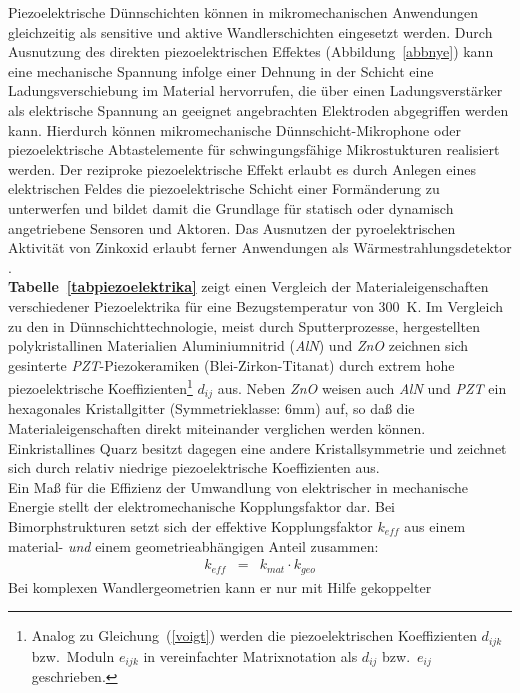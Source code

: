 Piezoelektrische Dünnschichten können in mikromechanischen Anwendungen
gleichzeitig als sensitive und aktive Wandlerschichten eingesetzt
werden. Durch Ausnutzung des direkten piezoelektrischen Effektes
(Abbildung~\ref{abbnye}) kann eine mechanische Spannung infolge einer
Dehnung in der Schicht
eine Ladungsverschiebung im Material hervorrufen, die über einen
Ladungsverstärker als elektrische Spannung an geeignet angebrachten
Elektroden abgegriffen werden kann.  Hierdurch können mikromechanische
Dünnschicht-Mikrophone \cite{Fra88, Kim87} oder piezoelektrische
Abtastelemente für schwingungsfähige Mikrostukturen \cite{Blo90}
realisiert werden.  Der reziproke piezoelektrische Effekt erlaubt es
durch Anlegen eines elektrischen Feldes die piezoelektrische Schicht
einer Formänderung zu unterwerfen und bildet damit die Grundlage für
statisch oder dynamisch angetriebene Sensoren und Aktoren. Das Ausnutzen
der pyroelektrischen Aktivität von Zinkoxid erlaubt ferner Anwendungen
als Wärmestrahlungsdetektor \cite{Pol84}. \\
{\bf Tabelle~\ref{tabpiezoelektrika}} zeigt einen Vergleich
der Materialeigenschaften verschiedener Piezoelektrika
\cite{Fra88, Ike90a, LB82, Tic80, Sie81} für eine
Bezugstemperatur von 300~K. Im Vergleich zu den in
Dünnschichttechnologie, meist durch Sputterprozesse, hergestellten
polykristallinen Materialien Aluminiumnitrid ({\em AlN}) und {\em ZnO}
zeichnen sich gesinterte {\em PZT}-Piezokeramiken (Blei-Zirkon-Titanat)
durch extrem hohe piezoelektrische Koeffizienten\footnote{Analog zu
Gleichung~(\ref{voigt}) werden die piezoelektrischen Koeffizienten
$d_{ijk}$ bzw.\ Moduln $e_{ijk}$ in vereinfachter Matrixnotation als
$d_{ij}$ bzw.\ $e_{ij}$ geschrieben.}
$d_{ij}$ aus.  Neben {\em ZnO} weisen auch
{\em AlN} und {\em PZT} ein hexagonales Kristallgitter
(Symmetrieklasse: 6mm) auf, so daß die
Materialeigenschaften direkt miteinander verglichen werden können.
Einkristallines Quarz besitzt dagegen eine andere Kristallsymmetrie
und zeichnet sich durch relativ niedrige piezoelektrische Koeffizienten
aus.\\
%
Ein Maß für die Effizienz der Umwandlung von elektrischer in mechanische
Energie stellt der elektromechanische Kopplungsfaktor dar. Bei
Bimorphstrukturen setzt sich der effektive Kopplungsfaktor $k_{eff}$
aus einem material- {\em und} einem geometrieabhängigen Anteil zusammen:
\begin{eqnarray}
\label{kgeo}
 k_{eff} & = & k_{mat} \cdot k_{geo}
\end{eqnarray}
Bei komplexen Wandlergeometrien kann er nur mit Hilfe gekoppelter
